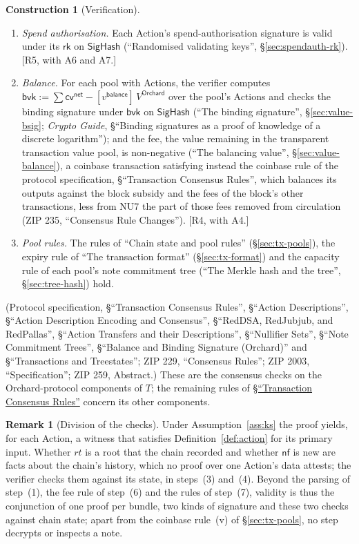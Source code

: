 \documentclass[11pt,a4paper]{article}
\theoremstyle{definition}
\newtheorem{construction}[theorem]{Construction}
\newtheorem{remark}[theorem]{Remark}
\newcommand{\nfsym}{\mathsf{nf}}
\newcommand{\cvsym}{\mathsf{cv}}
\newcommand{\rk}{\mathsf{rk}}
\begin{document}
\begin{construction}[Verification]
\begin{enumerate}[label=(\arabic*)]
  [R3, with A5.]
\item \emph{Spend authorisation.} Each Action's spend-authorisation
  signature is valid under its $\rk$ on $\mathsf{SigHash}$ (``Randomised
  validating keys'', \S\ref{sec:spendauth-rk}). [R5, with A6 and A7.]
\item \emph{Balance.} For each pool with Actions, the verifier computes
  $\mathsf{bvk} := \sum \cvsym^{\mathsf{net}} -
  [v^{\mathsf{balance}}]\,V^{\mathsf{Orchard}}$ over the pool's Actions and
  checks the binding signature under $\mathsf{bvk}$ on $\mathsf{SigHash}$
  (``The binding signature'', \S\ref{sec:value-bsig}; \emph{Crypto Guide},
  \S``Binding signatures as a proof of knowledge of a discrete
  logarithm''); and the fee, the value remaining in the transparent
  transaction value pool, is non-negative (``The balancing value'',
  \S\ref{sec:value-balance}), a coinbase transaction satisfying instead the
  coinbase rule of the protocol specification, \S``Transaction Consensus
  Rules'', which balances its outputs against the block subsidy and the fees
  of the block's other transactions, less from NU7 the part of those fees
  removed from circulation (ZIP 235, ``Consensus Rule Changes''). [R4, with
  A4.]
\item \emph{Pool rules.} The rules of ``Chain state and pool rules''
  (\S\ref{sec:tx-pools}), the expiry rule of ``The transaction format''
  (\S\ref{sec:tx-format}) and the capacity rule of each pool's note
  commitment tree (``The Merkle hash and the tree'', \S\ref{sec:tree-hash})
  hold.
\end{enumerate}
(Protocol specification, \S``Transaction Consensus Rules'', \S``Action
Descriptions'', \S``Action Description Encoding and Consensus'',
\S``RedDSA, RedJubjub, and RedPallas'', \S``Action Transfers and their
Descriptions'', \S``Nullifier Sets'', \S``Note Commitment Trees'',
\S``Balance and Binding Signature (Orchard)'' and \S``Transactions and
Treestates''; ZIP 229, ``Consensus Rules''; ZIP 2003, ``Specification'';
ZIP 259, Abstract.) These are the consensus checks on the Orchard-protocol
components of $T$; the remaining rules of
\href{https://zips.z.cash/protocol/protocol.pdf#txnconsensus}%
{\S``Transaction Consensus Rules''}
concern its other components.
\end{construction}

\begin{remark}[Division of the checks]
Under Assumption~\ref{ass:ks} the proof yields, for each Action, a witness
that satisfies Definition~\ref{def:action} for its primary input. Whether
$\mathit{rt}$ is a root that the chain recorded and whether $\nfsym$ is new
are facts about the chain's history, which no proof over one Action's data
attests; the verifier checks them against its state, in steps~(3)
and~(4). Beyond the parsing of step~(1), the fee rule of step~(6) and the
rules of step~(7), validity is thus the conjunction of one proof per bundle,
two kinds of signature and these two checks against chain state; apart from
the coinbase rule~(v) of \S\ref{sec:tx-pools}, no step decrypts or inspects
a note.
\end{remark}
\end{document}
